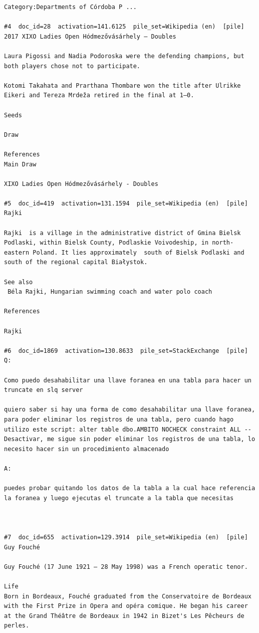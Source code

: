 \begin{verbatim}
Category:Departments of Córdoba P ...

#4  doc_id=28  activation=141.6125  pile_set=Wikipedia (en)  [pile]
2017 XIXO Ladies Open Hódmezővásárhely – Doubles

Laura Pigossi and Nadia Podoroska were the defending champions, but both players chose not to participate.

Kotomi Takahata and Prarthana Thombare won the title after Ulrikke Eikeri and Tereza Mrdeža retired in the final at 1–0.

Seeds

Draw

References
Main Draw

XIXO Ladies Open Hódmezővásárhely - Doubles

#5  doc_id=419  activation=131.1594  pile_set=Wikipedia (en)  [pile]
Rajki

Rajki  is a village in the administrative district of Gmina Bielsk Podlaski, within Bielsk County, Podlaskie Voivodeship, in north-eastern Poland. It lies approximately  south of Bielsk Podlaski and  south of the regional capital Białystok.

See also
 Béla Rajki, Hungarian swimming coach and water polo coach

References

Rajki

#6  doc_id=1869  activation=130.8633  pile_set=StackExchange  [pile]
Q:

Como puedo desahabilitar una llave foranea en una tabla para hacer un truncate en slq server

quiero saber si hay una forma de como desahabilitar una llave foranea, para poder eliminar los registros de una tabla, pero cuando hago utilizo este script: alter table dbo.AMBITO NOCHECK constraint ALL --Desactivar, me sigue sin poder eliminar los registros de una tabla, lo necesito hacer sin un procedimiento almacenado 

A:

puedes probar quitando los datos de la tabla a la cual hace referencia la foranea y luego ejecutas el truncate a la tabla que necesitas



#7  doc_id=655  activation=129.3914  pile_set=Wikipedia (en)  [pile]
Guy Fouché

Guy Fouché (17 June 1921 – 28 May 1998) was a French operatic tenor.

Life 
Born in Bordeaux, Fouché graduated from the Conservatoire de Bordeaux with the First Prize in Opera and opéra comique. He began his career at the Grand Théâtre de Bordeaux in 1942 in Bizet's Les Pêcheurs de perles.


\end{verbatim}
